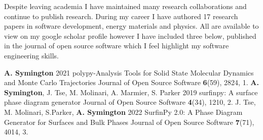 \begin{cvparagraph}
Despite leaving academia I have maintained many research collaborations and continue to publish research. During my career I have authored 17 research papers in software development, energy materials and physics. All are available to view on my google scholar profile however I have included three below, published in the journal of open source software which I feel highlight my software engineering skills. 
\end{cvparagraph}
\begin{cvpubys}
    \cvpuby
        {\textbf{A. Symington}}
        {2021}
        {polypy-Analysis Tools for Solid State Molecular Dynamics and Monte Carlo Trajectories}
        {Journal of Open Source Software}
        {\textbf{6}(59), 2824,}
        {}
        {1.}
    \cvpuby
        {\textbf{A. Symington}, J. Tse, M. Molinari, A. Marmier, S. Parker}
        {2019}
        {surfinpy: A surface phase diagram generator}
        {Journal of Open Source Software}
        {\textbf{4}(34), 1210,}
        {}
        {2.}
    \cvpuby
        {J. Tse, M. Molinari, S.Parker, \textbf{A. Symington}}
        {2022}
        {SurfinPy 2.0: A Phase Diagram Generator for Surfaces and Bulk Phases}
        {Journal of Open Source Software}
        {\textbf{7}(71), 4014,}
        {}
        {3.}
    \end{cvpubys}
